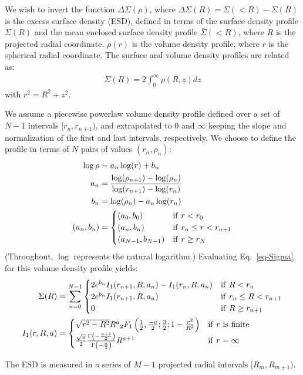 \documentclass{article}
\begin{document}
We wish to invert the function $\Delta\Sigma(\rho)$, where $\Delta\Sigma(R) = \bar{\Sigma}(<R) - \Sigma(R)$ is the excess surface density (ESD), defined in terms of the surface density profile $\Sigma(R)$ and the mean enclosed surface density profile $\bar{\Sigma}(<R)$, where $R$ is the projected radial coordinate. $\rho(r)$ is the volume density profile, where $r$ is the spherical radial coordinate. The surface and volume density profiles are related as:
\begin{align}
  \Sigma(R) = 2\int_0^\infty\rho(R, z)dz\label{eq-Sigma}
\end{align}
with $r^2 = R^2 + z^2$.

We assume a piecewise powerlaw volume density profile defined over a set of $N-1$ intervals $[r_n, r_{n+1})$, and extrapolated to $0$ and $\infty$ keeping the slope and normalization of the first and last intervals, respectively. We choose to define the profile in terms of $N$ pairs of values $(r_n,\rho_n)$:
\begin{align}
  \log\rho &= a_n \log(r) + b_n \\
  a_n &= \frac{\log(\rho_{n+1})-\log(\rho_n)}{\log(r_{n+1})-\log(r_n)}\\
  b_n &= \log(\rho_n) - a_n\log(r_n)\\
  (a_n, b_n) &=
  \begin{cases}
    (a_0, b_0) & {\rm if}\ r < r_0\\
    (a_n, b_n) & {\rm if}\ r_n \leq r < r_{n+1}\\
    (a_{N-1}, b_{N-1}) & {\rm if}\ r \geq r_N
  \end{cases}
\end{align}
(Throughout, $\log$ represents the natural logarithm.) Evaluating Eq.~\ref{eq-Sigma} for this volume density profile yields:
\begin{align}
  \Sigma(R) &= \sum_{n=0}^{N-1}
  \begin{cases}
    2e^{b_n}I_1(r_{n+1}, R, a_n) - I_1(r_n, R, a_n) & {\rm if}\ R < r_n\\
    2e^{b_n}I_1(r_{n+1}, R, a_n) & {\rm if}\ r_n \leq R < r_{n+1}\\
    0 & {\rm if}\ R \geq r_{n+1}\\
  \end{cases}\\
  I_1(r, R, a) &=
  \begin{cases}
    \sqrt{r^2-R^2}R^a{}_2F_1\left(\frac{1}{2},\frac{-a}{2};\frac{3}{2};1-\frac{r^2}{R^2}\right) & {\rm if}\ r\ {\rm is}\ {\rm finite}\\
    \frac{\sqrt{\pi}}{2}\frac{\Gamma\left(-\frac{a+1}{2}\right)}{\Gamma\left(-\frac{a}{2}\right)}R^{a+1} & {\rm if}\ r = \infty
  \end{cases}
\end{align}

The ESD is measured in a series of $M-1$ projected radial intervals $[R_m, R_{m+1})$.
\end{document}
